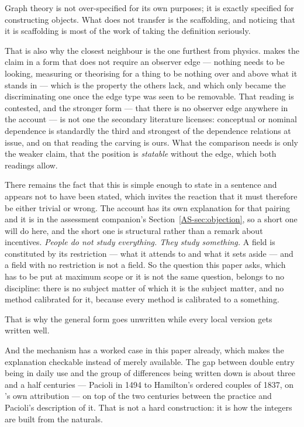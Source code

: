 \documentclass[11pt,a4paper]{article}
\begin{document}
Graph theory is not over-specified for its
own purposes; it is exactly specified for constructing objects. What does not transfer is the
scaffolding, and noticing that it is scaffolding is most of the work of taking the definition
seriously.

That is also why the closest neighbour is the one furthest from physics. \citet{nagarjuna1995} makes the
claim in a form that does not require an observer edge --- nothing needs to be looking, measuring or
theorising for a thing to be nothing over and above what it stands in --- which is the property the
others lack, and which only became the discriminating one once the edge type was seen to be removable.
That reading is contested, and the stronger form --- that there is no observer edge anywhere in the
account --- is not one the secondary literature licenses: conceptual or nominal dependence
is standardly the third and strongest of the dependence relations at issue, and on that reading the
carving is ours. What the comparison needs is only the weaker claim, that the position is
\emph{statable} without the edge, which both readings allow.

There remains the fact that this is simple enough to state in a sentence and appears not to have been
stated, which invites the reaction that it must therefore be either trivial or wrong. The account has its own explanation
for that pairing and it is in the assessment companion's Section~\ref{AS-sec:objection}, so a short one
will do here, and the short one
is structural rather than a remark about incentives. \emph{People do not study everything. They study
something.} A field is constituted by its restriction --- what it attends to and what it sets aside ---
and a field with no restriction is not a field. So the question this paper asks, which has to be put at
maximum scope or it is not the same question, belongs to no discipline: there is no subject matter of
which it is the subject matter, and no method calibrated for it, because every method is calibrated to
a something.

That is why the general form goes unwritten while every local version gets written well.

And the mechanism has a worked case in this paper already, which makes
the explanation checkable instead of merely available. The gap between double entry being in daily
use and the group of differences being written down is about three and a half centuries --- Pacioli in
1494 to Hamilton's ordered couples of 1837, on \citeauthor{ellerman2014}'s own attribution --- on top of the two centuries
between the practice and Pacioli's description of it. That is not a hard construction: it is how the
integers are built from the naturals.
\end{document}

